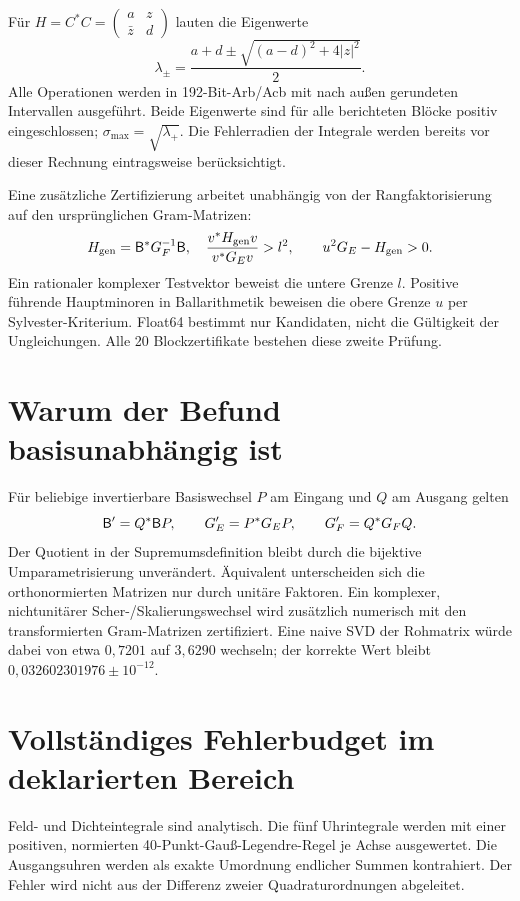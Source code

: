 \documentclass[10pt,a4paper]{article}
\begin{document}
Für $H=C^*C=\left(\begin{smallmatrix}a&z\\\bar z&d\end{smallmatrix}\right)$
lauten die Eigenwerte
\[
 \lambda_\pm=\frac{a+d\pm\sqrt{(a-d)^2+4|z|^2}}2.
\]
Alle Operationen werden in 192-Bit-Arb/Acb mit nach außen gerundeten
Intervallen ausgeführt. Beide Eigenwerte sind für alle berichteten
Blöcke positiv eingeschlossen; $\sigma_{\max}=\sqrt{\lambda_+}$.
Die Fehlerradien der Integrale werden bereits vor dieser Rechnung
eintragsweise berücksichtigt.

Eine zusätzliche Zertifizierung arbeitet unabhängig von der Rangfaktorisierung
auf den ursprünglichen Gram-Matrizen:
\[
 H_{\rm gen}=\mathsf B^*G_F^{-1}\mathsf B,\quad
 \frac{v^*H_{\rm gen}v}{v^*G_Ev}>l^2,
 \qquad u^2G_E-H_{\rm gen}>0.
\]
Ein rationaler komplexer Testvektor beweist die untere Grenze $l$.
Positive führende Hauptminoren in Ballarithmetik beweisen die obere
Grenze $u$ per Sylvester-Kriterium. Float64 bestimmt nur Kandidaten,
nicht die Gültigkeit der Ungleichungen. Alle 20 Blockzertifikate bestehen
diese zweite Prüfung.

\section{Warum der Befund basisunabhängig ist}
Für beliebige invertierbare Basiswechsel $P$ am Eingang und $Q$ am
Ausgang gelten
\[
 \mathsf B'=Q^*\mathsf B P,\qquad G_E'=P^*G_EP,\qquad G_F'=Q^*G_FQ.
\]
Der Quotient in der Supremumsdefinition bleibt durch die bijektive
Umparametrisierung unverändert. Äquivalent unterscheiden sich die
orthonormierten Matrizen nur durch unitäre Faktoren. Ein komplexer,
nichtunitärer Scher-/Skalierungswechsel wird zusätzlich numerisch
mit den transformierten Gram-Matrizen zertifiziert. Eine naive SVD
der Rohmatrix würde dabei von etwa $0{,}7201$ auf $3{,}6290$ wechseln;
der korrekte Wert bleibt $0{,}032602301976\pm10^{-12}$.

\newpage
\section{Vollständiges Fehlerbudget im deklarierten Bereich}
Feld- und Dichteintegrale sind analytisch. Die fünf Uhrintegrale werden
mit einer positiven, normierten 40-Punkt-Gauß-Legendre-Regel je Achse
ausgewertet. Die Ausgangsuhren werden als exakte Umordnung endlicher
Summen kontrahiert. Der Fehler wird nicht aus der Differenz zweier
Quadraturordnungen abgeleitet.
\end{document}
